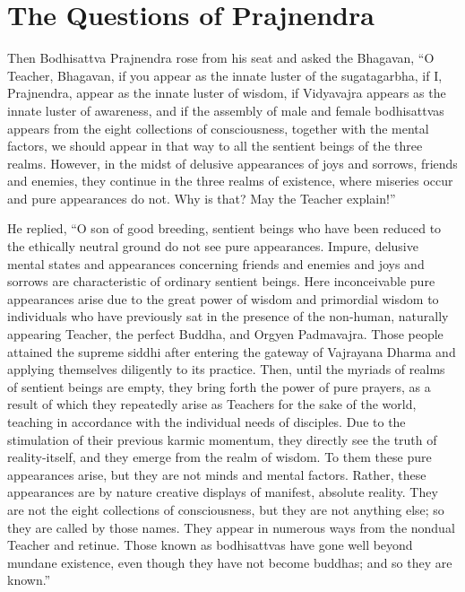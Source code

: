 \documentclass[a4paper,11pt,twoside,final]{book}
\begin{document}
\section{The Questions of Prajnendra}

Then Bodhisattva Prajnendra rose from his seat and asked the Bhagavan,
``O Teacher, Bhagavan, if you appear as the innate luster of the
sugatagarbha, if I, Prajnendra, appear as the innate luster of wisdom,
if Vidyavajra appears as the innate luster of awareness, and if the
assembly of male and female bodhisattvas appears from the eight
collections of consciousness, together with the mental factors, we
should appear in that way to all the sentient beings of the three
realms. However, in the midst of delusive appearances of joys and
sorrows, friends and enemies, they continue in the three realms of
existence, where miseries occur and pure appearances do not. Why is
that? May the Teacher explain!''

He replied, ``O son of good breeding, sentient beings who have been
reduced to the ethically neutral ground do not see pure
appearances. Impure, delusive mental states and appearances concerning
friends and enemies and joys and sorrows are characteristic of
ordinary sentient beings. Here inconceivable pure appearances arise
due to the great power of wisdom and primordial wisdom to individuals
who have previously sat in the presence of the non-human, naturally
appearing Teacher, the perfect Buddha, and Orgyen Padmavajra. Those
people attained the supreme siddhi after entering the gateway of
Vajrayana Dharma and applying themselves diligently to its
practice. Then, until the myriads of realms of sentient beings are
empty, they bring forth the power of pure prayers, as a result of
which they repeatedly arise as Teachers for the sake of the world,
teaching in accordance with the individual needs of disciples. Due to
the stimulation of their previous karmic momentum, they directly see
the truth of reality-itself, and they emerge from the realm of
wisdom. To them these pure appearances arise, but they are not minds
and mental factors. Rather, these appearances are by nature creative
displays of manifest, absolute reality. They are not the eight
collections of consciousness, but they are not anything else; so they
are called by those names. They appear in numerous ways from the
nondual Teacher and retinue. Those known as bodhisattvas have gone
well beyond mundane existence, even though they have not become
buddhas; and so they are known.''
\end{document}
